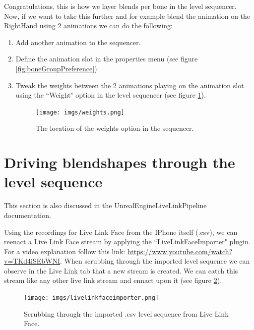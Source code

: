 \documentclass{uva-inf-article}
\begin{document}
Congratulations, this is how we layer blends per bone in the level sequencer.
Now, if we want to take this further and for example blend the animation on the RightHand using 2 animations we can do the following:
\begin{enumerate}
    \item Add another animation to the sequencer.
    \item Define the animation slot in the properties menu (see figure \ref{fig:boneGroupPreference}).
    \item Tweak the weights between the 2 animations playing on the animation slot using the ``Weight" option in the level sequencer (see figure \ref{fig:weights}).
    \begin{figure}[hbt!]
        \centering
        \texttt{[image: imgs/weights.png]}
        \caption{The location of the weights option in the sequencer.}
        \label{fig:weights}
    \end{figure}
\end{enumerate}

\section{Driving blendshapes through the level sequence}
This section is also discussed in the UnrealEngineLiveLinkPipeline documentation.

Using the recordings for Live Link Face from the IPhone itself (.csv), we can reenact a Live Link Face stream by applying the ``LiveLinkFaceImporter" plugin. For a video explanation follow this link: \url{https://www.youtube.com/watch?v=TKd4iSEbWNI}.
When scrubbing through the imported level sequence we can observe in the Live Link tab that a new stream is created. We can catch this stream like any other live link stream and ennact upon it (see figure \ref{fig:llfimporter}).
\begin{figure}[hbt!]
    \centering
    \texttt{[image: imgs/livelinkfaceimporter.png]}
    \caption{Scrubbing through the imported .csv level sequence from Live Link Face.}
    \label{fig:llfimporter}
\end{figure}
\end{document}
